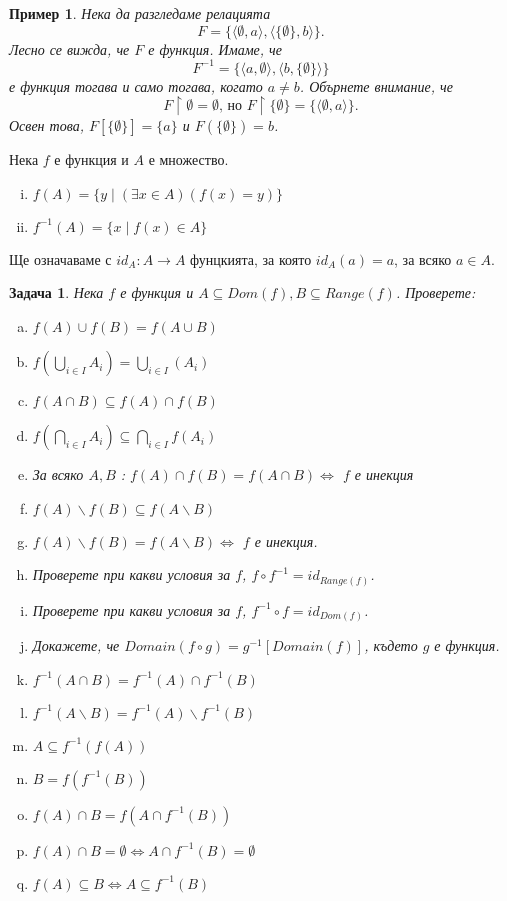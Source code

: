 \documentclass[a4paper]{article}
\newtheorem{problem}{Задача}
\newtheorem{example}{Пример}
\begin{document}
\begin{example}
  Нека да разгледаме релацията \[F = \{\langle{\emptyset, a}\rangle,\langle{\{\emptyset\}, b}\rangle\}.\]
  Лесно се вижда, че $F$ е функция.
  Имаме, че \[F^{-1} = \{\langle{a,\emptyset}\rangle,\langle{b, \{\emptyset\}}\rangle\}\] е функция тогава и само тогава, когато  $a\neq b$.
  Обърнете внимание, че
  \[F\upharpoonright{\emptyset} = \emptyset \mbox{, но } F\upharpoonright\{\emptyset\} = \{\langle{\emptyset,a}\rangle\}.\]
  Освен това, $F[\{\emptyset\}] = \{a\}$ и $F(\{\emptyset\}) = b$.
\end{example}

  Нека $f$ е функция и $A$ е множество.
  \begin{enumerate}[(i)]
  \item
    $f(A) = \{y \mid (\exists x\in A)(f(x) = y)\}$
  \item
    $f^{-1}(A) = \{x \mid f(x)\in A\}$
  \end{enumerate}
  

Ще означаваме с $id_A:A\to A$ фунцкията, за която $id_A(a) = a$, за всяко $a\in A$.
\begin{problem}
  Нека $f$ е функция и $A\subseteq Dom(f), B\subseteq Range(f)$.
  Проверете:
  \begin{enumerate}[a)]
  \item
    $f(A)\cup f(B) = f(A\cup B)$
  \item
    $f(\bigcup_{i\in I}A_i) = \bigcup_{i\in I}(A_i)$
  \item
    $f(A\cap B)\subseteq f(A)\cap f(B)$
  \item
    $f(\bigcap_{i\in I}A_i) \subseteq \bigcap_{i\in I}f(A_i)$
  \item
    За всяко $A,B$ : $f(A)\cap f(B) = f(A\cap B) \iff$
    $f$ е инекция
  \item
    $f(A)\backslash f(B)\subseteq f(A\backslash B)$
  \item
    $f(A)\backslash f(B) = f(A\backslash B) \iff$
    $f$ е инекция.
  \item
    Проверете при какви условия за $f$, $f\circ f^{-1} = id_{Range(f)}$.
  \item
    Проверете при какви условия за $f$, $f^{-1}\circ f = id_{Dom(f)}$.
  \item
    Докажете, че $Domain(f\circ g) = g^{-1}[Domain(f)]$, където $g$ е функция.
  \item
    $f^{-1}(A\cap B) = f^{-1}(A)\cap f^{-1}(B)$
  \item
    $f^{-1}(A\backslash B) = f^{-1}(A)\backslash f^{-1}(B)$
  \item
    $A\subseteq f^{-1}(f(A))$
  \item
    $B = f(f^{-1}(B))$
  \item
    $f(A)\cap B = f(A\cap f^{-1}(B))$
  \item
    $f(A)\cap B = \emptyset \iff A\cap f^{-1}(B) = \emptyset$
  \item
    $f(A)\subseteq B \iff A\subseteq f^{-1}(B)$
  \end{enumerate}
\end{problem}
\end{document}
